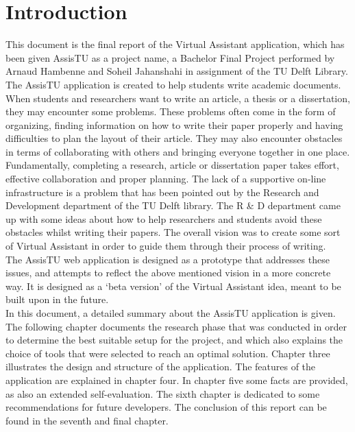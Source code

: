 \chapter{Introduction}

This document is the final report of the Virtual Assistant application, which has been given AssisTU as a project name, a Bachelor Final Project performed by Arnaud Hambenne and Soheil Jahanshahi in assignment of the TU Delft Library. The AssisTU application is created to help students write academic documents. When students and researchers want to write an article, a thesis or a dissertation, they may encounter some problems. These problems often come in the form of organizing, finding information on how to write their paper properly and having difficulties to plan the layout of their article. They may also encounter obstacles in terms of collaborating with others and bringing everyone together in one place. \\

Fundamentally, completing a research, article or dissertation paper takes effort, effective collaboration and proper planning. The lack of a supportive on-line infrastructure is a problem that has been pointed out by the Research and Development department of the TU Delft library. The R \& D department came up with some ideas about how to help researchers and students avoid these obstacles whilst writing their papers. The overall vision was to create some sort of Virtual Assistant in order to guide them through their process of writing.\\

The AssisTU web application is designed as a prototype that addresses these issues, and attempts to reflect the above mentioned vision in a more concrete way. It is designed as a `beta version' of the Virtual Assistant idea, meant to be built upon in the future.\\ 

In this document, a detailed summary about the AssisTU application is given. The following chapter documents the research phase that was conducted in order to determine the best suitable setup for the project, and which also explains the choice of tools that were selected to reach an optimal solution. 
Chapter three illustrates the design and structure of the application. The features of the application are explained in chapter four. In chapter five some facts are provided, as also an extended self-evaluation. The sixth chapter is dedicated to some recommendations for future developers. The conclusion of this report can be found in the seventh and final chapter. 